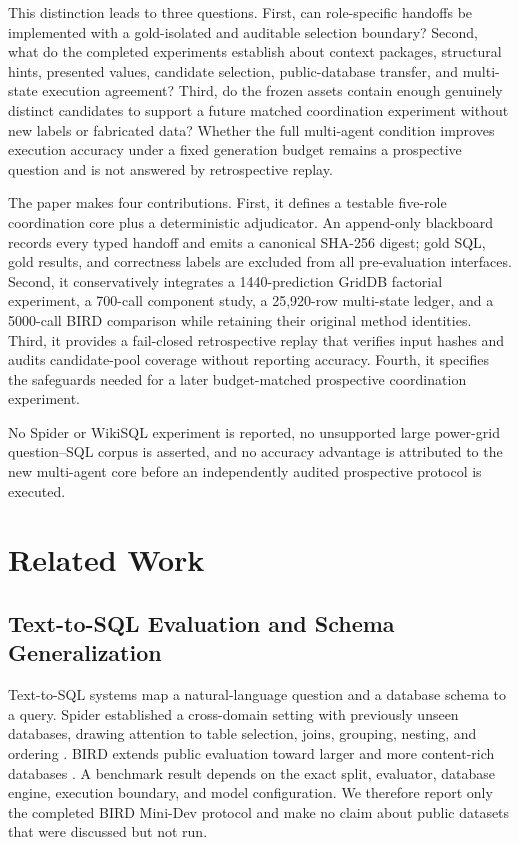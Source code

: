 \documentclass[applsci,article,submit,moreauthors]{Definitions/mdpi}
\begin{document}
This distinction leads to three questions. First, can role-specific handoffs be implemented with a gold-isolated and auditable selection boundary? Second, what do the completed experiments establish about context packages, structural hints, presented values, candidate selection, public-database transfer, and multi-state execution agreement? Third, do the frozen assets contain enough genuinely distinct candidates to support a future matched coordination experiment without new labels or fabricated data? Whether the full multi-agent condition improves execution accuracy under a fixed generation budget remains a prospective question and is not answered by retrospective replay.

The paper makes four contributions. First, it defines a testable five-role coordination core plus a deterministic adjudicator. An append-only blackboard records every typed handoff and emits a canonical SHA-256 digest; gold SQL, gold results, and correctness labels are excluded from all pre-evaluation interfaces. Second, it conservatively integrates a 1440-prediction GridDB factorial experiment, a 700-call component study, a 25,920-row multi-state ledger, and a 5000-call BIRD comparison while retaining their original method identities. Third, it provides a fail-closed retrospective replay that verifies input hashes and audits candidate-pool coverage without reporting accuracy. Fourth, it specifies the safeguards needed for a later budget-matched prospective coordination experiment.

No Spider or WikiSQL experiment is reported, no unsupported large power-grid question--SQL corpus is asserted, and no accuracy advantage is attributed to the new multi-agent core before an independently audited prospective protocol is executed.

\section{Related Work}

\subsection{Text-to-SQL Evaluation and Schema Generalization}

Text-to-SQL systems map a natural-language question and a database schema to a query. Spider established a cross-domain setting with previously unseen databases, drawing attention to table selection, joins, grouping, nesting, and ordering \cite{yu2018spider}. BIRD extends public evaluation toward larger and more content-rich databases \cite{li2023bird}. A benchmark result depends on the exact split, evaluator, database engine, execution boundary, and model configuration. We therefore report only the completed BIRD Mini-Dev protocol and make no claim about public datasets that were discussed but not run.
\end{document}
